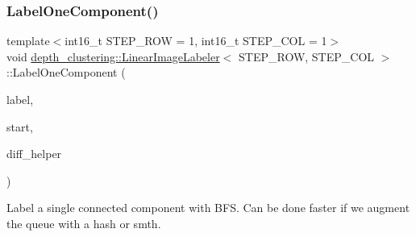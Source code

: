 \subsubsection{\texorpdfstring{Label\+One\+Component()}{LabelOneComponent()}}
{\footnotesize\ttfamily template$<$int16\+\_\+t S\+T\+E\+P\+\_\+\+R\+OW = 1, int16\+\_\+t S\+T\+E\+P\+\_\+\+C\+OL = 1$>$ \\
void \hyperlink{classdepth__clustering_1_1LinearImageLabeler}{depth\+\_\+clustering\+::\+Linear\+Image\+Labeler}$<$ S\+T\+E\+P\+\_\+\+R\+OW, S\+T\+E\+P\+\_\+\+C\+OL $>$\+::Label\+One\+Component (\begin{DoxyParamCaption}\item[{uint16\+\_\+t}]{label,  }\item[{const \hyperlink{structdepth__clustering_1_1PixelCoord}{Pixel\+Coord} \&}]{start,  }\item[{const \hyperlink{classdepth__clustering_1_1AbstractDiff}{Abstract\+Diff} $\ast$}]{diff\+\_\+helper }\end{DoxyParamCaption})\hspace{0.3cm}{\ttfamily [inline]}}



Label a single connected component with B\+FS. Can be done faster if we augment the queue with a hash or smth. 


